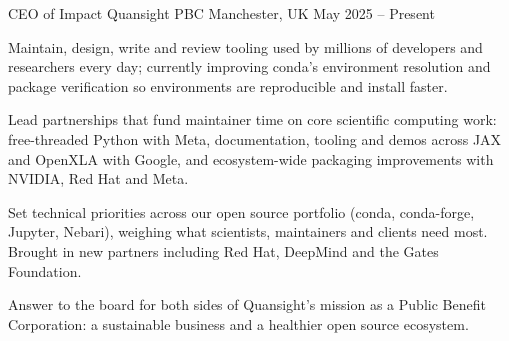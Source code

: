 
\begin{cventries}

\cventry
{CEO of Impact}
{Quansight PBC}
{Manchester, UK}
{May 2025 -- Present}
{
\begin{cvitems}
  \item {Maintain, design, write and review tooling used by millions of developers and researchers every day; currently improving conda's environment resolution and package verification so environments are reproducible and install faster.}
  \item {Lead partnerships that fund maintainer time on core scientific computing work: free-threaded Python with Meta, documentation, tooling and demos across JAX and OpenXLA with Google, and ecosystem-wide packaging improvements with NVIDIA, Red Hat and Meta.}
  \item {Set technical priorities across our open source portfolio (conda, conda-forge, Jupyter, Nebari), weighing what scientists, maintainers and clients need most. Brought in new partners including Red Hat, DeepMind and the Gates Foundation.}
  \item {Answer to the board for both sides of Quansight's mission as a Public Benefit Corporation: a sustainable business and a healthier open source ecosystem.}
\end{cvitems}
}


\end{cventries}

